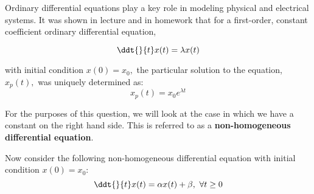 


Ordinary differential equations play a key role in modeling physical and electrical systems.
It was shown in lecture and in homework that for a first-order, constant coefficient ordinary differential equation,

\begin{equation} \label{eq:h}
\ddt{}{t} x(t) = \lambda x(t)
\end{equation}

with initial condition $x(0) = x_0,$ the particular solution to the equation, $x_p(t),$ was uniquely determined as:
\begin{equation} \label{eq:hs}
x_p(t) = x_0 e^{\lambda t}
\end{equation}

For the purposes of this question, we will look at the case in which we have a constant on the right hand side.
This is referred to as a \textbf{non-homogeneous differential equation}.

Now consider the following non-homogeneous differential equation with initial condition $x(0) = x_0$:
\begin{equation} \label{eq:nh}
    \ddt{}{t} x(t)  = \alpha x(t) + \beta, \ \forall t \geq 0
\end{equation}

